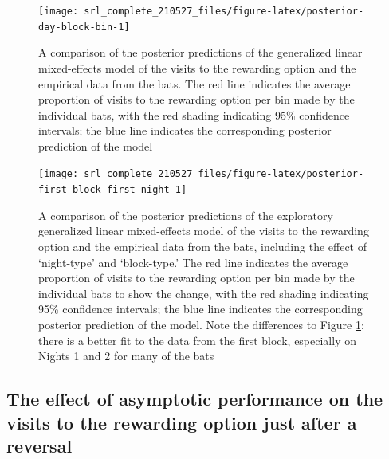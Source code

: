 \documentclass[
]{article}
\begin{document}
\begin{figure}[H]

{\centering \texttt{[image: srl\_complete\_210527\_files/figure-latex/posterior-day-block-bin-1]} 

}

\caption{A comparison of the posterior predictions of the generalized linear mixed-effects model of the visits to the rewarding option and the empirical data from the bats. The red line indicates the average proportion of visits to the rewarding option per bin made by the individual bats, with the red shading indicating 95\% confidence intervals; the blue line indicates the corresponding posterior prediction of the model}\label{fig:posterior-day-block-bin}
\end{figure}



\begin{figure}[H]

{\centering \texttt{[image: srl\_complete\_210527\_files/figure-latex/posterior-first-block-first-night-1]} 

}

\caption{A comparison of the posterior predictions of the exploratory generalized linear mixed-effects model of the visits to the rewarding option and the empirical data from the bats, including the effect of `night-type' and `block-type.' The red line indicates the average proportion of visits to the rewarding option per bin made by the individual bats to show the change, with the red shading indicating 95\% confidence intervals; the blue line indicates the corresponding posterior prediction of the model. Note the differences to Figure \ref{fig:posterior-day-block-bin}: there is a better fit to the data from the first block, especially on Nights 1 and 2 for many of the bats}\label{fig:posterior-first-block-first-night}
\end{figure}

\hypertarget{the-effect-of-asymptotic-performance-on-the-visits-to-the-rewarding-option-just-after-a-reversal}{%
\subsection{The effect of asymptotic performance on the visits to the rewarding option just after a reversal}\label{the-effect-of-asymptotic-performance-on-the-visits-to-the-rewarding-option-just-after-a-reversal}}
\end{document}
